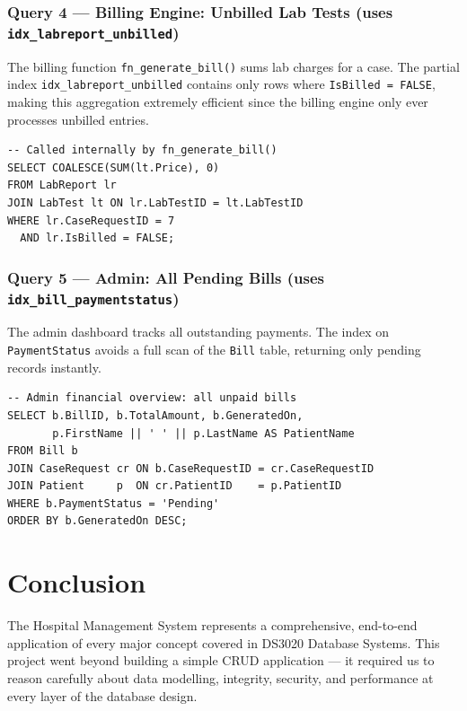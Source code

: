 \documentclass{article}
\begin{document}
\subsubsection{Query 4 --- Billing Engine: Unbilled Lab Tests (uses \texttt{idx\_labreport\_unbilled})}
The billing function \texttt{fn\_generate\_bill()} sums lab charges for a case. The partial index \texttt{idx\_labreport\_unbilled} contains only rows where \texttt{IsBilled = FALSE}, making this aggregation extremely efficient since the billing engine only ever processes unbilled entries.

\begin{lstlisting}
-- Called internally by fn_generate_bill()
SELECT COALESCE(SUM(lt.Price), 0)
FROM LabReport lr
JOIN LabTest lt ON lr.LabTestID = lt.LabTestID
WHERE lr.CaseRequestID = 7
  AND lr.IsBilled = FALSE;
\end{lstlisting}

\subsubsection{Query 5 --- Admin: All Pending Bills (uses \texttt{idx\_bill\_paymentstatus})}
The admin dashboard tracks all outstanding payments. The index on \texttt{PaymentStatus} avoids a full scan of the \texttt{Bill} table, returning only pending records instantly.

\begin{lstlisting}
-- Admin financial overview: all unpaid bills
SELECT b.BillID, b.TotalAmount, b.GeneratedOn,
       p.FirstName || ' ' || p.LastName AS PatientName
FROM Bill b
JOIN CaseRequest cr ON b.CaseRequestID = cr.CaseRequestID
JOIN Patient     p  ON cr.PatientID    = p.PatientID
WHERE b.PaymentStatus = 'Pending'
ORDER BY b.GeneratedOn DESC;
\end{lstlisting}

\newpage
\section{Conclusion}

The Hospital Management System represents a comprehensive, end-to-end application of every major concept covered in DS3020 Database Systems. This project went beyond building a simple CRUD application --- it required us to reason carefully about data modelling, integrity, security, and performance at every layer of the database design.
\end{document}
